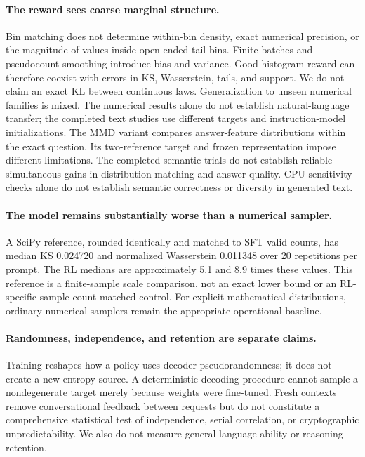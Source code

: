 \documentclass[11pt,letterpaper]{article}
\begin{document}
\paragraph{The reward sees coarse marginal structure.}
Bin matching does not determine within-bin density, exact numerical precision,
or the magnitude of values inside open-ended tail bins. Finite batches and
pseudocount smoothing introduce bias and variance. Good histogram reward
can therefore coexist with errors in KS, Wasserstein, tails, and support.
We do not claim an exact KL between continuous laws. Generalization to
unseen numerical families is mixed. The numerical results alone do not
establish natural-language transfer; the completed text studies use
different targets and instruction-model initializations.
The MMD variant compares answer-feature distributions within the exact
question. Its two-reference target and frozen representation impose
different limitations. The completed semantic trials do not establish
reliable simultaneous gains in distribution matching and answer quality.
CPU sensitivity checks alone do not establish semantic correctness or
diversity in generated text.

\paragraph{The model remains substantially worse than a numerical sampler.}
A SciPy reference, rounded identically and matched to SFT valid counts,
has median KS 0.024720 and normalized Wasserstein 0.011348 over 20
repetitions per prompt. The RL medians are approximately 5.1 and 8.9
times these values. This reference is a finite-sample scale comparison,
not an exact lower bound or an RL-specific sample-count-matched control.
For explicit mathematical distributions, ordinary numerical samplers
remain the appropriate operational baseline.

\paragraph{Randomness, independence, and retention are separate claims.}
Training reshapes how a policy uses decoder pseudorandomness; it does
not create a new entropy source. A deterministic decoding procedure
cannot sample a nondegenerate target merely because weights were
fine-tuned. Fresh contexts remove conversational feedback between
requests but do not constitute a comprehensive statistical test of
independence, serial correlation, or cryptographic unpredictability.
We also do not measure general language ability or reasoning retention.
\end{document}
